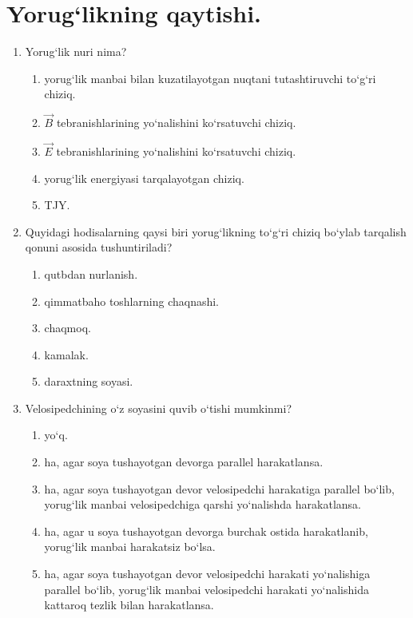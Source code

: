 

\section{Yorug‘likning qaytishi.}



\begin{enumerate}

\item Yorug‘lik nuri nima?
\begin{enumerate}[label=\Alph*)]
\item yorug‘lik manbai bilan kuzatilayotgan nuqtani tutashtiruvchi to‘g‘ri chiziq.
\item $\vec{B}$ tebranishlarining yo‘nalishini ko‘rsatuvchi chiziq.
\item $\vec{E}$ tebranishlarining yo‘nalishini ko‘rsatuvchi chiziq.
\item yorug‘lik energiyasi tarqalayotgan chiziq.
\item TJY.
\end{enumerate}

\item Quyidagi hodisalarning qaysi biri yorug‘likning to‘g‘ri chiziq bo‘ylab tarqalish qonuni asosida tushuntiriladi?
\begin{enumerate}[label=\Alph*)]
\item qutbdan nurlanish.
\item qimmatbaho toshlarning chaqnashi.
\item chaqmoq.
\item kamalak.
\item daraxtning soyasi.
\end{enumerate}

\item Velosipedchining o‘z soyasini quvib o‘tishi mumkinmi?
\begin{enumerate}[label=\Alph*)]
\item yo‘q.
\item ha, agar soya tushayotgan devorga parallel harakatlansa.
\item ha, agar soya tushayotgan devor velosipedchi harakatiga parallel bo‘lib, yorug‘lik manbai velosipedchiga qarshi yo‘nalishda harakatlansa.
\item ha, agar u soya tushayotgan devorga burchak ostida harakatlanib, yorug‘lik manbai harakatsiz bo‘lsa.
\item ha, agar soya tushayotgan devor velosipedchi harakati yo‘nalishiga parallel bo‘lib, yorug‘lik manbai velosipedchi harakati yo‘nalishida kattaroq tezlik bilan harakatlansa.
\end{enumerate}


\end{enumerate}
